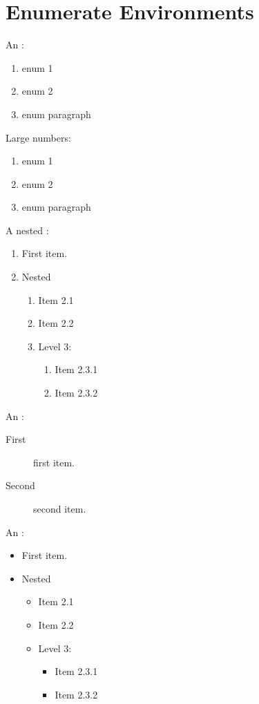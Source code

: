 \documentclass[showbib, lang=en]{DeanReport}
\begin{document}
\section{Enumerate Environments}
An :
\begin{enumerate}
    \item enum 1
    \item enum 2
    \item enum paragraph \lipsum[2]
\end{enumerate}
Large numbers:
\begin{enumerate}[start=9]
    \item enum 1
    \item enum 2
    \item enum paragraph \lipsum[2]
\end{enumerate}

A nested :
\begin{enumerate}
    \item First item.
    \item Nested 
    \begin{enumerate}
        \item Item 2.1
        \item Item 2.2
        \item Level 3:
        \begin{enumerate}
            \item Item 2.3.1
            \item Item 2.3.2
        \end{enumerate}
    \end{enumerate}
\end{enumerate}

An :
\begin{description}
    \item[First] first item.
    \item[Second] second item.
\end{description}

An :
\begin{itemize}
    \item First item.
    \item Nested 
    \begin{itemize}
        \item Item 2.1
        \item Item 2.2
        \item Level 3:
        \begin{itemize}
            \item Item 2.3.1
            \item Item 2.3.2
        \end{itemize}
    \end{itemize}
\end{itemize}
\end{document}
